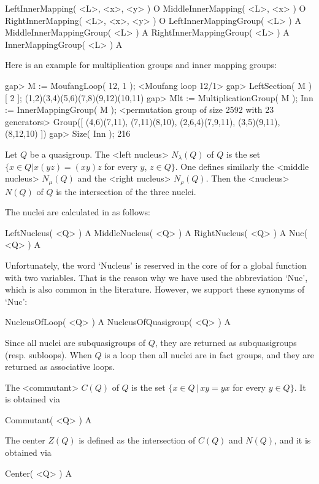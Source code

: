 \>LeftInnerMapping( <L>, <x>, <y> ) O
\>MiddleInnerMapping( <L>, <x> ) O
\>RightInnerMapping( <L>, <x>, <y> ) O
\>LeftInnerMappingGroup( <L> ) A
\>MiddleInnerMappingGroup( <L> ) A
\>RightInnerMappingGroup( <L> ) A
\>InnerMappingGroup( <L> ) A

Here is an example for multiplication groups and inner mapping groups:

\beginexample
gap> M := MoufangLoop( 12, 1 );
<Moufang loop 12/1>
gap> LeftSection( M )[ 2 ];
(1,2)(3,4)(5,6)(7,8)(9,12)(10,11)
gap> Mlt := MultiplicationGroup( M ); Inn := InnerMappingGroup( M );
<permutation group of size 2592 with 23 generators>
Group([ (4,6)(7,11), (7,11)(8,10), (2,6,4)(7,9,11), (3,5)(9,11), (8,12,10) ])
gap> Size( Inn );
216
\endexample


Let $Q$ be a quasigroup. The <left nucleus> $N_\lambda(Q)$
of $Q$ is the set $\{x\in Q| x(yz)=(xy)z$ for every $y$, $z\in Q\}$. One
defines similarly the <middle nucleus> $N_\mu(Q)$ and the
<right nucleus> $N_\rho(Q)$. Then the
<nucleus> $N(Q)$ of $Q$ is the intersection of the three nuclei.

The nuclei are calculated in {\LOOPS} as follows:

\>LeftNucleus( <Q> ) A
\>MiddleNucleus( <Q> ) A
\>RightNucleus( <Q> ) A
\>Nuc( <Q> ) A

Unfortunately, the word `Nucleus' is reserved in the core of {\GAP} for a
global function with two variables. That is the reason why we have used the
abbreviation `Nuc', which is also common in the literature. However, we support
these synonyms of `Nuc':

\>NucleusOfLoop( <Q> ) A
\>NucleusOfQuasigroup( <Q> ) A

Since all nuclei are subquasigroups of $Q$, they are returned as subquasigroups
(resp. subloops). When $Q$ is a loop then all nuclei are in fact groups, and
they are returned as associative loops.

The <commutant> $C(Q)$ of $Q$ is the set $\{x\in Q\,|\,xy=yx$
for every $y\in Q\}$. It is obtained via

\>Commutant( <Q> ) A

The center $Z(Q)$ is defined as the intersection of $C(Q)$ and $N(Q)$, and it
is obtained via

\>Center( <Q> ) A

